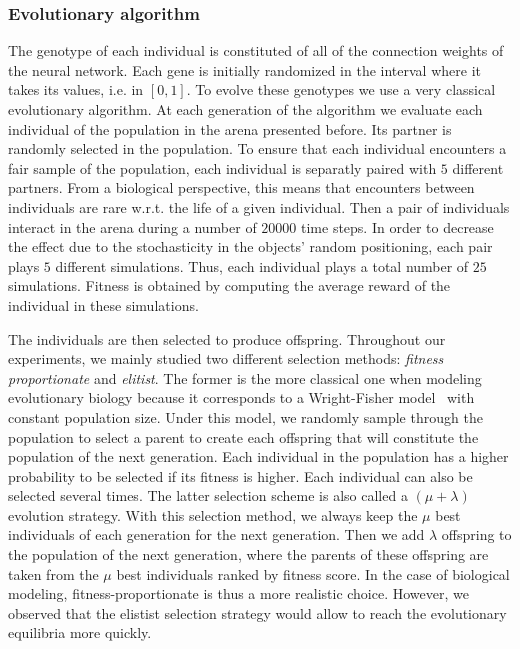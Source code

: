     \subsubsection{Evolutionary algorithm} The genotype of each individual is constituted of all of the connection weights of the neural network. Each gene is initially randomized in the interval where it takes its values, i.e. in \([0,1]\). To evolve these genotypes we use a very classical evolutionary algorithm. At each generation of the algorithm we evaluate each individual of the population in the arena presented before. Its partner is randomly selected in the population. To ensure that each individual encounters a fair sample of the population, each individual is separatly paired with $5$ different partners. From a biological perspective, this means that encounters between individuals are rare w.r.t. the life of a given individual. Then a pair of individuals interact in the arena during a number of $20000$ time steps. In order to decrease the effect due to the stochasticity in the objects' random positioning, each pair plays $5$ different simulations. Thus, each individual plays a total number of $25$ simulations. Fitness is obtained by computing the average reward of the individual in these simulations.

    The individuals are then selected to produce offspring. Throughout our experiments, we mainly studied two different selection methods: \emph{fitness proportionate} and \emph{elitist}. The former is the more classical one when modeling evolutionary biology because it corresponds to a Wright-Fisher model~\parencite{Wright1931} with constant population size. Under this model, we randomly sample through the population to select a parent to create each offspring that will constitute the population of the next generation. Each individual in the population has a higher probability to be selected if its fitness is higher. Each individual can also be selected several times. The latter selection scheme is also called a \((\mu + \lambda)\) evolution strategy. With this selection method, we always keep the $\mu$ best individuals of each generation for the next generation. Then we add $\lambda$ offspring to the population of the next generation, where the parents of these offspring are taken from the $\mu$ best individuals ranked by fitness score. In the case of biological modeling, fitness-proportionate is thus a more realistic choice. However, we observed that the elistist selection strategy would allow to reach the evolutionary equilibria more quickly.

